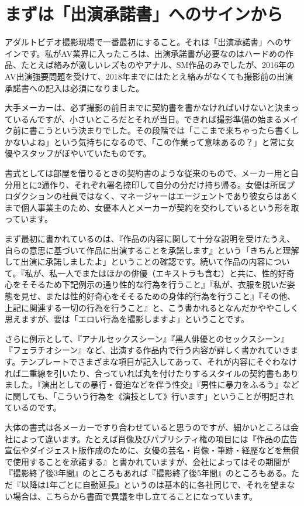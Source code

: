 \documentclass[12pt,UTF8]{ctexbook}
\begin{document}
\section{まずは「出演承諾書」へのサインから}

アダルトビデオ撮影現場で一番最初にすること。それは「出演承諾書」へのサインです。私がAV業界に入ったころは、出演承諾書が必要なのはハードめの作品、たとえば絡みが激しいレズものやアナル、SM作品のみでしたが、2016年のAV出演強要問題を受けて、2018年までにはたとえ絡みがなくても撮影前の出演承諾書への記入は必須になりました。

大手メーカーは、必ず撮影の前日までに契約書を書かなければいけないと決まっているんですが、小さいところだとそれが当日。できれば撮影準備の始まるメイク前に書こうという決まりでした。その段階では「ここまで来ちゃったら書くしかないよね」という気持ちになるので、「この作業って意味あるの？」と常に女優やスタッフがぼやいていたものです。

書式としては部屋を借りるときの契約書のような従来のもので、メーカー用と自分用とに2通作り、それぞれ署名捺印して自分の分だけ持ち帰る。女優は所属プロダクションの社員ではなく、マネージャーはエージェントであり彼女らはあくまで個人事業主のため、女優本人とメーカーが契約を交わしているという形を取っています。

まず最初に書かれているのは、『作品の内容に関して十分な説明を受けたうえ、自らの意思に基づいて作品に出演することを承諾します』という「きちんと理解して出演に承諾しましたよ」ということの確認です。続いて作品の内容について。『私が、私一人でまたはほかの俳優（エキストラも含む）と共に、性的好奇心をそそるため下記例示の通り性的な行為を行うこと』『私が、衣服を脱いだ姿態を見せ、または性的好奇心をそそるための身体的行為を行うこと』『その他、上記に関連する一切の行為を行うこと』と、こう書かれるとなんだかややこしく思えますが、要は「エロい行為を撮影しますよ」ということです。

さらに例示として、『アナルセックスシーン』『黒人俳優とのセックスシーン』『フェラチオシーン』など、出演する作品内で行う内容が詳しく書かれていきます。テンプレートでさまざまな項目が記入してあって、それが内容にそぐわなければ二重線を引いたり、合っていれば丸を付けたりするスタイルの契約書もありました。『演出としての暴行・脅迫などを伴う性交』『男性に暴力をふるう』などに関しても、「こういう行為を《演技として》行います」ということが明記されているのです。

大体の書式は各メーカーですり合わせていると思うのですが、細かいところは会社によって違います。たとえば肖像及びパブリシティ権の項目には『作品の広告宣伝やダイジェスト版作成のために、女優の芸名・肖像・筆跡・経歴などを無償で使用することを承諾する』と書かれていますが、会社によってはその期間が『撮影終了後3年間』のところもあれば『撮影終了後5年間』のところもある。ただ『以降は1年ごとに自動延長』というのは基本的に各社同じで、それを望まない場合は、こちらから書面で異議を申し立てることになっています。
\end{document}
